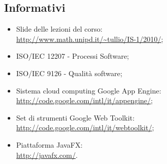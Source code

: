 \subsection{Informativi}
\begin{itemize}
  \item Slide delle lezioni del corso:\\
  \url{http://www.math.unipd.it/~tullio/IS-1/2010/};
  \item ISO/IEC 12207 - Processi Software;
  \item ISO/IEC 9126 - Qualit\`a software;
  \item Sistema cloud computing Google App Engine:\\
  \url{http://code.google.com/intl/it/appengine/};
  \item Set di strumenti Google Web Toolkit:\\
  \url{http://code.google.com/intl/it/webtoolkit/};
  \item Piattaforma JavaFX:\\
  \url{http://javafx.com/}.
\end{itemize}
